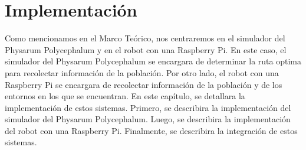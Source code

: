 \section{Implementaci\'on}
\label{sec:Implementacion}
        Como mencionamos en el Marco Te\'orico, nos centraremos en el simulador del 
            Physarum Polycephalum y en el robot con una Raspberry Pi. En este caso,
            el simulador del Physarum Polycephalum se encargara de determinar la ruta
            optima para recolectar informaci\'on de la poblaci\'on. Por otro lado, el
            robot con una Raspberry Pi se encargara de recolectar informaci\'on de la
            poblaci\'on y de los entornos en los que se encuentran.
        \vskip 0.5cm
        En este cap\'itulo, se detallara la implementaci\'on de estos sistemas. 
            Primero, se describira la implementaci\'on del simulador del Physarum Polycephalum.
            Luego, se describira la implementaci\'on del robot con una Raspberry Pi.
            Finalmente, se describira la integraci\'on de estos sistemas.
        \vskip 0.5cm
    
    